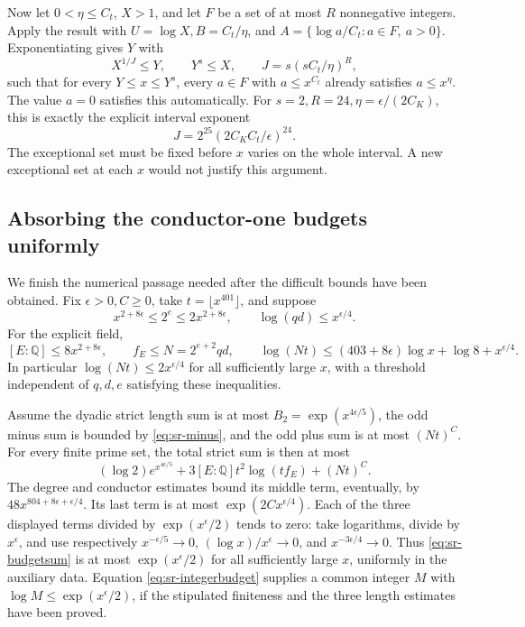 Now let \(0<\eta\leq C_t\), \(X>1\), and let \(F\) be a set of at most
\(R\) nonnegative integers.
Apply the result with
\(U=\log X,B=C_t/\eta\), and
\(A=\{\log a/C_t:a\in F,\ a>0\}\).
Exponentiating gives \(Y\) with
\[
 X^{1/J}\leq Y,\qquad Y^s\leq X,\qquad
 J=s(sC_t/\eta)^R,
\]
such that for every \(Y\leq x\leq Y^s\), every \(a\in F\) with
\(a\leq x^{C_t}\) already satisfies \(a\leq x^\eta\).
The value \(a=0\) satisfies this automatically.
For \(s=2,R=24,\eta=\epsilon/(2C_K)\), this is exactly the explicit
interval exponent
\begin{equation}\label{eq:sr-J}
 J=2^{25}(2C_KC_t/\epsilon)^{24}.
\end{equation}
The exceptional set must be fixed before \(x\) varies on the whole
interval. A new exceptional set at each \(x\) would not justify this argument.

\subsection{Absorbing the conductor-one budgets uniformly}
We finish the numerical passage needed after the difficult bounds have
been obtained. Fix \(\epsilon>0,C\geq0\), take
\(t=\lfloor x^{401}\rfloor\), and suppose
\[
 x^{2+8\epsilon}\leq2^e\leq2x^{2+8\epsilon},
 \qquad \log(qd)\leq x^{\epsilon/4}.
\]
For the explicit field,
\[
 [E:\mathbb Q]\leq8x^{2+8\epsilon},\qquad
 f_E\leq N=2^{e+2}qd,\qquad
 \log(Nt)\leq(403+8\epsilon)\log x+\log8+x^{\epsilon/4}.
\]
In particular \(\log(Nt)\leq2x^{\epsilon/4}\) for all sufficiently large
\(x\), with a threshold independent of \(q,d,e\) satisfying these inequalities.

Assume the dyadic strict length sum is at most
\(B_2=\exp(x^{4\epsilon/5})\), the odd minus sum is bounded by
\eqref{eq:sr-minus}, and the odd plus sum is at most \((Nt)^C\).
For every finite prime set, the total strict sum is then at most
\begin{equation}\label{eq:sr-budgetsum}
 (\log2)e^{x^{4\epsilon/5}}
 +3[E:\mathbb Q]t^2\log(tf_E)+(Nt)^C.
\end{equation}
The degree and conductor estimates bound its middle term, eventually, by
\(48x^{804+8\epsilon+\epsilon/4}\).
Its last term is at most \(\exp(2Cx^{\epsilon/4})\).
Each of the three displayed terms divided by
\(\exp(x^\epsilon/2)\) tends to zero:
take logarithms, divide by \(x^\epsilon\), and use respectively
\(x^{-\epsilon/5}\to0\), \((\log x)/x^\epsilon\to0\), and
\(x^{-3\epsilon/4}\to0\).
Thus \eqref{eq:sr-budgetsum} is at most \(\exp(x^\epsilon/2)\)
for all sufficiently large \(x\), uniformly in the auxiliary data.
Equation \eqref{eq:sr-integerbudget} supplies a common integer \(M\)
with \(\log M\leq\exp(x^\epsilon/2)\), if the stipulated finiteness
and the three length estimates have been proved.

